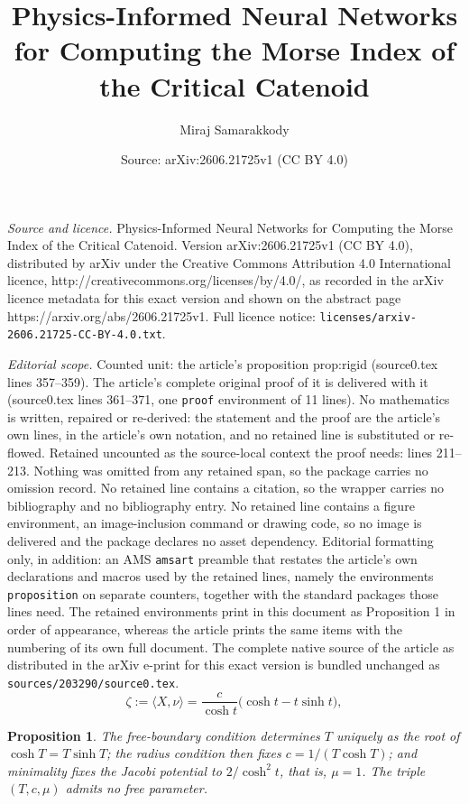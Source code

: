 \documentclass[10pt,a4paper]{amsart}
\title{Physics-Informed Neural Networks for Computing the Morse Index of the Critical Catenoid}
\author{Miraj Samarakkody}
\date{Source: arXiv:2606.21725v1 (CC BY 4.0)}
\newtheorem{proposition}{Proposition}
\begin{document}
\maketitle

\noindent\emph{Source and licence.} Physics-Informed Neural Networks for Computing the Morse Index of the Critical Catenoid. Version arXiv:2606.21725v1 (CC BY 4.0), distributed by arXiv under the Creative Commons Attribution 4.0 International licence, http://creativecommons.org/licenses/by/4.0/, as recorded in the arXiv licence metadata for this exact version and shown on the abstract page https://arxiv.org/abs/2606.21725v1. Full licence notice: \texttt{licenses/arxiv-2606.21725-CC-BY-4.0.txt}.\par\smallskip

\noindent\textit{Editorial scope.} Counted unit: the article's proposition prop:rigid (source0.tex lines 357--359). The article's complete original proof of it is delivered with it (source0.tex lines 361--371, one \texttt{proof} environment of 11 lines). No mathematics is written, repaired or re-derived: the statement and the proof are the article's own lines, in the article's own notation, and no retained line is substituted or re-flowed.  Retained uncounted as the source-local context the proof needs: lines 211--213.  Nothing was omitted from any retained span, so the package carries no omission record.  No retained line contains a citation, so the wrapper carries no bibliography and no bibliography entry.  No retained line contains a figure environment, an image-inclusion command or drawing code, so no image is delivered and the package declares no asset dependency.  Editorial formatting only, in addition: an AMS \texttt{amsart} preamble that restates the article's own declarations and macros used by the retained lines, namely the environments \texttt{proposition} on separate counters, together with the standard packages those lines need.  The retained environments print in this document as Proposition 1 in order of appearance, whereas the article prints the same items with the numbering of its own full document.  The complete native source of the article as distributed in the arXiv e-print for this exact version is bundled unchanged as \texttt{sources/203290/source0.tex}.
\begin{equation}\label{eq:zeta}
	\zeta := \langle X, \nu \rangle = \frac{c}{\cosh t}\bigl(\cosh t - t\sinh t\bigr),
\end{equation}

\begin{proposition}\label{prop:rigid}
	The free-boundary condition determines $T$ uniquely as the root of $\cosh T = T\sinh T$; the radius condition then fixes $c = 1/(T\cosh T)$; and minimality fixes the Jacobi potential to $2/\cosh^2 t$, that is, $\mu = 1$. The triple $(T, c, \mu)$ admits no free parameter.
\end{proposition}
\end{document}
